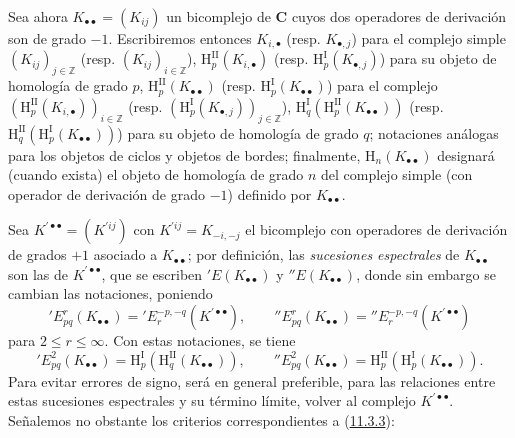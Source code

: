 \begin{env}[11.3.5]
\label{0.11.3.5-fr}
Sea ahora $K_{\bullet\bullet}=(K_{ij})$ un bicomplejo de
$\boldsymbol{C}$ cuyos dos operadores de derivación son de grado $-1$. Escribiremos
entonces $K_{i,\bullet}$ (resp. $K_{\bullet,j}$) para el complejo simple
$(K_{ij})_{j\in\mathbb Z}$ (resp. $(K_{ij})_{i\in\mathbb Z}$),
$\mathrm H_p^{\mathrm{II}}(K_{i,\bullet})$ (resp.
$\mathrm H_p^{\mathrm I}(K_{\bullet,j})$) para su objeto de homología de grado $p$,
$\mathrm H_p^{\mathrm{II}}(K_{\bullet\bullet})$ (resp.
$\mathrm H_p^{\mathrm I}(K_{\bullet\bullet})$) para el complejo
$(\mathrm H_p^{\mathrm{II}}(K_{i,\bullet}))_{i\in\mathbb Z}$ (resp.
$(\mathrm H_p^{\mathrm I}(K_{\bullet,j}))_{j\in\mathbb Z}$),
$\mathrm H_q^{\mathrm I}(\mathrm H_p^{\mathrm{II}}(K_{\bullet\bullet}))$
(resp.
$\mathrm H_q^{\mathrm{II}}(\mathrm H_p^{\mathrm I}(K_{\bullet\bullet}))$)
para su objeto de homología de grado $q$; notaciones análogas para los objetos de ciclos
y objetos de bordes; finalmente, $\mathrm H_n(K_{\bullet\bullet})$ designará
(cuando exista) el objeto de homología de grado $n$ del complejo simple (con
operador de derivación de grado $-1$) definido por $K_{\bullet\bullet}$.

Sea $K^{\prime\bullet\bullet}=(K^{\prime ij})$ con
$K^{\prime ij}=K_{-i,-j}$ el bicomplejo con operadores de derivación de grados
$+1$ asociado a $K_{\bullet\bullet}$; por definición, las
\emph{sucesiones espectrales} de $K_{\bullet\bullet}$ son las de
$K^{\prime\bullet\bullet}$, que se escriben $'E(K_{\bullet\bullet})$ y
$''E(K_{\bullet\bullet})$, donde sin embargo se cambian las notaciones, poniendo
\[
  'E_{pq}^r(K_{\bullet\bullet})
  ='E_r^{-p,-q}(K^{\prime\bullet\bullet}),\qquad
  ''E_{pq}^r(K_{\bullet\bullet})
  =''E_r^{-p,-q}(K^{\prime\bullet\bullet})
\]
para $2\leq r\leq\infty$. Con estas notaciones, se tiene
\[
  'E_{pq}^2(K_{\bullet\bullet})
  =\mathrm H_p^{\mathrm I}(\mathrm H_q^{\mathrm{II}}(K_{\bullet\bullet})),
  \qquad
  ''E_{pq}^2(K_{\bullet\bullet})
  =\mathrm H_p^{\mathrm{II}}(\mathrm H_p^{\mathrm I}(K_{\bullet\bullet})).
\]
Para evitar errores de signo, será en general preferible, para las
relaciones entre estas sucesiones espectrales y su término límite, volver al
complejo $K^{\prime\bullet\bullet}$. Señalemos no obstante los criterios
correspondientes a (\hyperref[0.11.3.3-fr]{11.3.3}):
\end{env}

